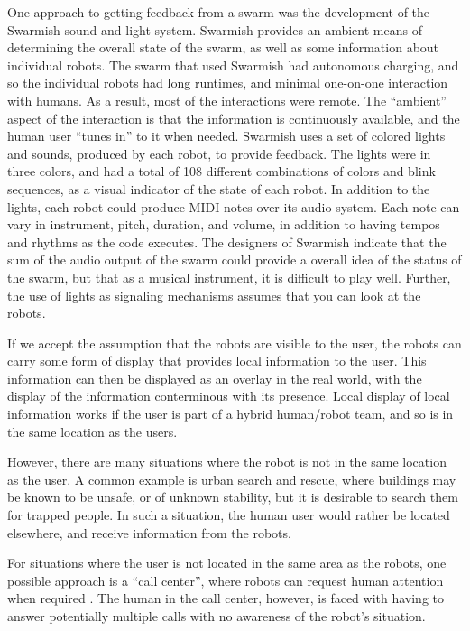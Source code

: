 \documentclass[]{article}
\begin{document}
One approach to getting feedback from a swarm was the development of the Swarmish sound and light system\cite{mclurkin2006speaking}. 
Swarmish provides an ambient means of determining the overall state of the swarm, as well as some information about individual robots. 
The swarm that used Swarmish had autonomous charging, and so the individual robots had long runtimes, and minimal one-on-one interaction with humans. 
As a result, most of the interactions were remote.
The ``ambient'' aspect of the interaction is that the information is continuously available, and the human user ``tunes in'' to it when needed. 
Swarmish uses a set of colored lights and sounds, produced by each robot, to provide feedback. 
The lights were in three colors, and had a total of 108 different combinations of colors and blink sequences, as a visual indicator of the state of each robot. 
In addition to the lights, each robot could produce MIDI notes over its audio system. 
Each note can vary in instrument, pitch, duration, and volume, in addition to having tempos and rhythms as the code executes. 
The designers of Swarmish indicate that the sum of the audio output of the swarm could provide a overall idea of the status of the swarm, but that as a musical instrument, it is difficult to play well. 
Further, the use of lights as signaling mechanisms assumes that you can look at the robots. 

If we accept the assumption that the robots are visible to the user, the robots can carry some form of display that provides local information to the user. 
This information can then be displayed as an overlay in the real world, with the display of the information conterminous with its presence\cite{Daily:2003:WEI:820752.821587}. 
Local display of local information works if the user is part of a hybrid human/robot team, and so is in the same location as the users. 

However, there are many situations where the robot is not in the same location as the user. 
A common example is urban search and rescue, where buildings may be known to be unsafe, or of unknown stability, but it is desirable to search them for trapped people. 
In such a situation, the human user would rather be located elsewhere, and receive information from the robots. 

For situations where the user is not located in the same area as the robots, one possible approach is a ``call center'', where robots can request human attention when required \cite{chen2011supervisory}. The human in the call center, however, is faced with having to answer potentially multiple calls with no awareness of the robot's situation. 
\end{document}
